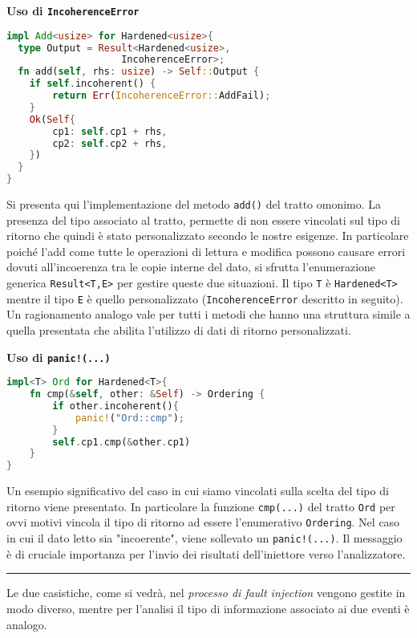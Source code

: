 \begin{multicols}{2}
\noindent
\textbf{Uso di \texttt{IncoherenceError} }
\begin{lstlisting}[language=Rust, style=boxed]
impl Add<usize> for Hardened<usize>{
  type Output = Result<Hardened<usize>, 
                    IncoherenceError>;
  fn add(self, rhs: usize) -> Self::Output {
    if self.incoherent() {
        return Err(IncoherenceError::AddFail);
    }
    Ok(Self{
        cp1: self.cp1 + rhs,
        cp2: self.cp2 + rhs,
    })
  }
}
\end{lstlisting}
Si presenta qui l'implementazione del metodo \texttt{add()} del tratto omonimo. La presenza del tipo associato al tratto, permette di non essere vincolati sul tipo di ritorno che quindi è stato personalizzato secondo le nostre esigenze. In particolare poiché l'add come tutte le operazioni di lettura e modifica possono causare errori dovuti all'incoerenza tra le copie interne del dato, si sfrutta l'enumerazione generica \texttt{Result<T,E>} per gestire queste due situazioni. Il tipo \texttt{T} è \texttt{Hardened<T>} mentre il tipo \texttt{E} è quello personalizzato (\texttt{IncoherenceError} descritto in seguito). Un ragionamento analogo vale per tutti i metodi che hanno una struttura simile a quella presentata che abilita l'utilizzo di dati di ritorno personalizzati. 

\newcolumn
\noindent
\textbf{Uso di \texttt{panic!(...)}}
\begin{lstlisting}[language=Rust, style=boxed]
impl<T> Ord for Hardened<T>{
    fn cmp(&self, other: &Self) -> Ordering {
        if other.incoherent(){
            panic!("Ord::cmp");
        }
        self.cp1.cmp(&other.cp1)
    }
}
\end{lstlisting}
Un esempio significativo del caso in cui siamo vincolati  sulla scelta del tipo di ritorno viene presentato. In particolare la funzione \texttt{cmp(...)} del tratto \texttt{Ord} per ovvi motivi vincola il tipo di ritorno ad essere l'enumerativo \texttt{Ordering}. Nel caso in cui il dato letto sia "incoerente", viene sollevato un \texttt{panic!(...)}. Il messaggio è di cruciale importanza per l'invio dei risultati dell'iniettore verso l'analizzatore. \\
\hrule
\vspace{0.5cm}
\noindent
Le due casistiche, come si vedrà, nel \textit{processo di fault injection} vengono gestite in modo diverso, mentre per l'analisi il tipo di informazione associato ai due eventi è analogo.

\end{multicols}

